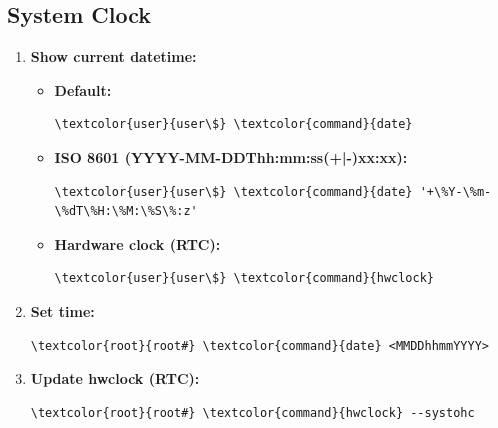 \documentclass[10pt, a4paper, onecolumn, oneside, titlepage, openany]{book}
\begin{document}
\subsection{System Clock}
\begin{enumerate}
    \item \textbf{Show current datetime:}
    \begin{itemize}
        \item \textbf{Default:}
\begin{Verbatim}[commandchars=\\\{\}]
\textcolor{user}{user\$} \textcolor{command}{date}
\end{Verbatim}   
        \item \textbf{ISO 8601 (YYYY-MM-DDThh:mm:ss(+|-)xx:xx):}
\begin{Verbatim}[commandchars=\\\{\}]
\textcolor{user}{user\$} \textcolor{command}{date} '+\%Y-\%m-\%dT\%H:\%M:\%S\%:z'
\end{Verbatim}
        \item \textbf{Hardware clock (RTC):}
\begin{Verbatim}[commandchars=\\\{\}]
\textcolor{user}{user\$} \textcolor{command}{hwclock}
\end{Verbatim}
    \end{itemize}
    \item \textbf{Set time:}
\begin{Verbatim}[commandchars=\\\{\}]
\textcolor{root}{root#} \textcolor{command}{date} <MMDDhhmmYYYY>
\end{Verbatim}
    \item \textbf{Update hwclock (RTC):}
\begin{Verbatim}[commandchars=\\\{\}]
\textcolor{root}{root#} \textcolor{command}{hwclock} --systohc
\end{Verbatim}
\end{enumerate}
\end{document}
